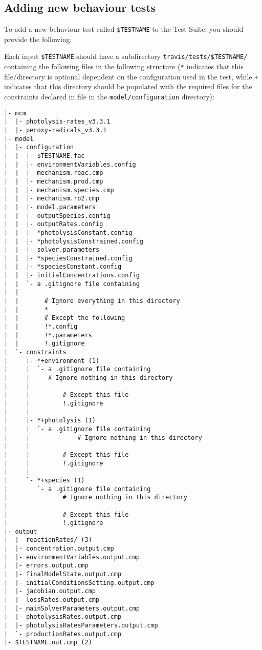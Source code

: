 \subsection{Adding new behaviour tests} \label{subsec:adding-new-behaviour-tests}

To add a new behaviour test called \texttt{\$TESTNAME} to the
Test Suite, you should provide the following:

Each input \texttt{\$TESTNAME} should have a subdirectory
\texttt{travis/tests/\$TESTNAME/} containing the following files in
the following structure (\texttt{*} indicates that this file/directory
is optional dependent on the configuration used in the test, while
\texttt{+} indicates that this directory should be populated with the
required files for the constraints declared in file in the
\texttt{model/configuration} directory):

\begin{verbatim}
|- mcm
|  |- photolysis-rates_v3.3.1
|  |- peroxy-radicals_v3.3.1
|- model
|  |- configuration
|  |  |- $TESTNAME.fac
|  |  |- environmentVariables.config
|  |  |- mechanism.reac.cmp
|  |  |- mechanism.prod.cmp
|  |  |- mechanism.species.cmp
|  |  |- mechanism.ro2.cmp
|  |  |- model.parameters
|  |  |- outputSpecies.config
|  |  |- outputRates.config
|  |  |- *photolysisConstant.config
|  |  |- *photolysisConstrained.config
|  |  |- solver.parameters
|  |  |- *speciesConstrained.config
|  |  |- *speciesConstant.config
|  |  |- initialConcentrations.config
|  |  `- a .gitignore file containing
|  |
|  |       # Ignore everything in this directory
|  |       *
|  |       # Except the following
|  |       !*.config
|  |       !*.parameters
|  |       !.gitignore
|  `- constraints
|     |- *+environment (1)
|     |  `- a .gitignore file containing
|     |     # Ignore nothing in this directory
|     |
|     |         # Except this file
|     |         !.gitignore
|     |
|     |- *+photolysis (1)
|     |  `- a .gitignore file containing
|     |             # Ignore nothing in this directory
|     |
|     |         # Except this file
|     |         !.gitignore
|     |
|     `- *+species (1)
|        `- a .gitignore file containing
|               # Ignore nothing in this directory
|
|               # Except this file
|               !.gitignore
|- output
|  |- reactionRates/ (3)
|  |- concentration.output.cmp
|  |- environmentVariables.output.cmp
|  |- errors.output.cmp
|  |- finalModelState.output.cmp
|  |- initialConditionsSetting.output.cmp
|  |- jacobian.output.cmp
|  |- lossRates.output.cmp
|  |- mainSolverParameters.output.cmp
|  |- photolysisRates.output.cmp
|  |- photolysisRatesParameters.output.cmp
|  `- productionRates.output.cmp
|- $TESTNAME.out.cmp (2)
\end{verbatim}

